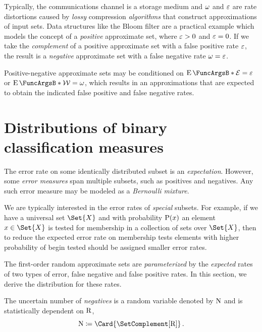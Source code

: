 \documentclass[10pt,final,hidelinks]{article}
\numberwithin{equation}{section}
\begin{document}
Typically, the communications channel is a storage medium and $\omega$ and $\varepsilon$ are rate distortions caused by \emph{lossy} compression \emph{algorithms} that construct approximations of input sets.
Data structures like the Bloom filter are a practical example which models the concept of a \emph{positive} approximate set, where $\varepsilon > 0$ and $\varepsilon = 0$.
If we take the \emph{complement} of a positive approximate set with a false positive rate $\varepsilon$, the result is a \emph{negative} approximate set with a false negative rate $\omega = \varepsilon$.

Positive-negative approximate sets may be conditioned on $\Expect{\FPR} = \fprate$ or $\Expect{\FNR} = \fnrate$, which results in an approximations that are expected to obtain the indicated false positive and false negative rates.

\providecommand{\mainx}{..}
\section{Distributions of binary classification measures}
\label{sec:characteristics}
The error rate on some identically distributed subset is an \emph{expectation}.
However, some \emph{error measures} span multiple subsets, such as positives and negatives.
Any such error measure may be modeled as a \emph{Bernoulli mixture}.

We are typically interested in the error rates of \emph{special} subsets.
For example, if we have a universal set $\Set{X}$ and with probability $\Fun{P}(x)$ an element $x \in \Set{X}$ is tested for membership in a collection of sets over $\Set{X}$, then to reduce the expected error rate on membership tests elements with higher probability of begin tested should be assigned smaller error rates.


The first-order random approximate sets are \emph{parameterized} by the \emph{expected} rates of two types of error, false negative and false positive rates.
In this section, we derive the distribution for these rates.

\begin{definition}
The uncertain number of \emph{negatives} is a random variable denoted by $\mathrm{N}$ and is statistically dependent on $\mathrm{R}$,
\begin{equation}
\RV{N} \coloneqq \Card{\SetComplement[\RV{R}]}\,.
\end{equation}
\end{definition}
\end{document}
